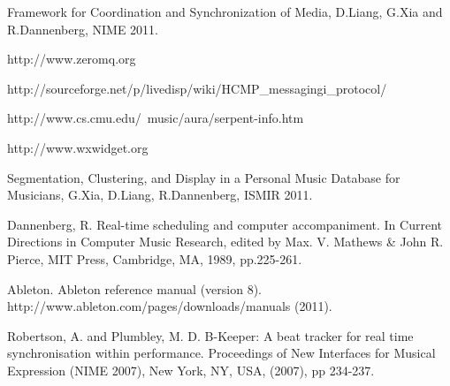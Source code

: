 \documentclass[12pt]{Latex/Classes/PhDthesisPSnPDF}
\begin{document}
\setcounter{page}{2}

\frontmatter



\setcounter{secnumdepth}{3} %
\setcounter{tocdepth}{3}    %
\tableofcontents %

\listoffigures	%

\listoftables

\newpage %


\pagestyle{headings}
\setcounter{page}{1}

\mainmatter
\renewcommand{\chaptername}{} %



			
	
%




\begin{thebibliography}{99}
Framework for Coordination and Synchronization of Media, D.Liang, G.Xia and 
R.Dannenberg, NIME 2011.

http://www.zeromq.org

http://sourceforge.net/p/livedisp/wiki/HCMP\_messagingi\_protocol/

http://www.cs.cmu.edu/~music/aura/serpent-info.htm

http://www.wxwidget.org

Segmentation, Clustering, and Display in a Personal Music Database for Musicians,
G.Xia, D.Liang, R.Dannenberg, ISMIR 2011.

Dannenberg, R. Real-time scheduling and computer accompaniment. In Current
Directions in Computer Music Research, edited by Max. V. Mathews \& John R.
Pierce, MIT Press, Cambridge, MA, 1989, pp.225-261.

Ableton. Ableton reference manual (version 8).
http://www.ableton.com/pages/downloads/manuals (2011).

Robertson, A. and Plumbley, M. D. B-Keeper: A beat tracker for real time
synchronisation within performance. Proceedings of New Interfaces for Musical
Expression (NIME 2007), New York, NY, USA, (2007), pp 234-237.

\end{thebibliography}


\end{document}
